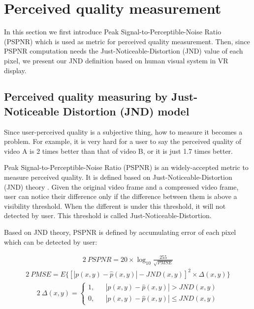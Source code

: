 \section{Perceived quality measurement}

In this section we first introduce Peak Signal-to-Perceptible-Noise Ratio (PSPNR) \cite{PSPNR} which is used as metric for perceived quality measurement. Then, since PSPNR computation needs the Just-Noticeable-Distortion (JND) \cite{JND} value of each pixel, we present our JND definition based on human visual system in VR display.

\subsection{Perceived quality measuring by Just-Noticeable Distortion (JND) model}

Since user-perceived quality is a subjective thing, how to measure it becomes a problem. For example, it is very hard for a user to say the perceived quality of video A is 2 times better than that of video B, or it is just 1.7 times better.

Peak Signal-to-Perceptible-Noise Ratio (PSPNR) \cite{PSPNR} is an widely-accepted metric to measure perceived quality. It is defined based on Just-Noticeable-Distortion (JND) theory \cite{JND}. Given the original video frame and a compressed video frame, user can notice their difference only if the difference between them is above a visibility threshold. When the different is under this threshold, it will not detected by user. This threshold is called Just-Noticeable-Distortion.

Based on JND theory, PSPNR is defined by accumulating error of each pixel which can be detected by user:

\begin{alignat}{2}\
\label{f1} PSPNR = 20 \times \log_{10}\frac{255}{\sqrt{PMSE}}
\end{alignat}
\begin{alignat}{2}\
PMSE=E\{ \left[ |p(x, y) - \hat{p}(x, y)| - JND(x, y)\right]^2 \times \Delta (x, y)\} \label{original_pmse}
\end{alignat}
\begin{alignat}{2}\
\Delta (x, y) =\left\{
\begin{aligned}
1, & &|p(x, y) - \hat{p}(x, y)| > JND(x, y) \\
0, & &|p(x, y) - \hat{p}(x, y)| \le JND(x, y)
\end{aligned}
\right.
\end{alignat}

